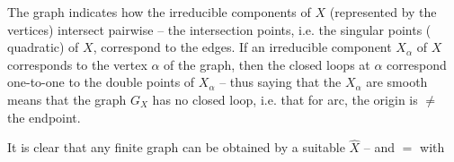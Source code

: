 The graph indicates how the irreducible components of $X$ (represented by the vertices) intersect pairwise -- the intersection points, i.e. the singular points ( quadratic) of $X$, correspond to the edges. If an irreducible component $X_\alpha$ of $X$ corresponds to the vertex $\alpha$ of the graph, then the closed loops at $\alpha$ correspond one-to-one to the double points of $X_\alpha$ -- thus saying that the $X_\alpha$ are smooth means that the graph $G_X$ has no closed loop, i.e. that for  arc, the origin is $\neq$ the endpoint.

It is clear that any finite graph can be obtained   by a suitable $\widehat X$ -- and $=$ with 
